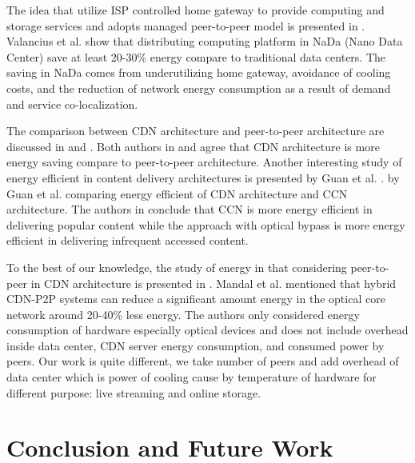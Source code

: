 \documentclass[conference]{IEEEtran}
\begin{document}
The idea that utilize ISP controlled home gateway to provide computing and storage services and adopts managed peer-to-peer model is presented in \cite{valancius2009greening}. 
Valancius et al. \cite{valancius2009greening} show that distributing computing platform in NaDa (Nano Data Center) save at least 20-30\% energy compare to traditional data centers.
The saving in NaDa comes from underutilizing home gateway, avoidance of cooling costs, and the reduction of network energy consumption as a result of demand and service co-localization.

The comparison between CDN architecture and peer-to-peer architecture are discussed in \cite{baliga2007energy} and \cite{feldmann2010energy}.
Both authors in \cite{baliga2007energy} and \cite{feldmann2010energy} agree that CDN architecture is more energy saving compare to peer-to-peer architecture. 
Another interesting study of energy efficient in content delivery architectures is presented by Guan et al. \cite{5963557}.
by Guan et al. \cite{5963557} comparing energy efficient of CDN architecture and CCN architecture.
The authors in \cite{5963557} conclude that CCN is more energy efficient in delivering popular content while the approach with optical bypass is more energy efficient in delivering infrequent accessed content.

To the best of our knowledge, the study of energy in that considering peer-to-peer in CDN architecture is presented in \cite{6524219}.
Mandal et al. \cite{6524219} mentioned that hybrid CDN-P2P systems can reduce a significant amount energy in the optical core network around 20-40\% less energy.  
The authors only considered energy consumption of hardware especially optical devices and does not include overhead inside data center, CDN server energy consumption, and consumed power by peers.
Our work is quite different, we take number of peers and add overhead of data center which is power of cooling cause by temperature of hardware for different purpose: live streaming and online storage.

\section{Conclusion and Future Work}\label{conclusion}
\end{document}
